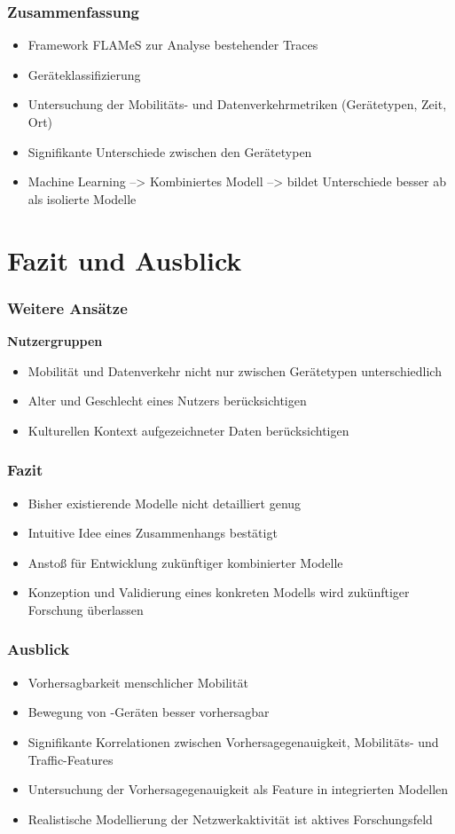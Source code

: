 \documentclass{beamer}
\begin{document}
\begin{frame}
  \frametitle{Zusammenfassung}
  \begin{itemize}
    \item Framework FLAMeS zur Analyse bestehender Traces
    \item Geräteklassifizierung
    \item Untersuchung der Mobilitäts- und Datenverkehrmetriken (Gerätetypen, Zeit, Ort)
    \item Signifikante Unterschiede zwischen den Gerätetypen
    \item Machine Learning --> Kombiniertes Modell --> bildet Unterschiede besser ab als isolierte Modelle
  \end{itemize}  
\end{frame}

\section{Fazit und Ausblick}

\begin{frame}
  \frametitle{Weitere Ansätze}
  \textbf{Nutzergruppen}
  \begin{itemize}
    \item Mobilität und Datenverkehr nicht nur zwischen Gerätetypen unterschiedlich
    \item Alter und Geschlecht eines Nutzers berücksichtigen
    \item Kulturellen Kontext aufgezeichneter Daten berücksichtigen    
  \end{itemize}
\end{frame}

\begin{frame}
  \frametitle{Fazit}
  \begin{itemize}
    \item Bisher existierende Modelle nicht detailliert genug
    \item Intuitive Idee eines Zusammenhangs bestätigt
    \item Anstoß für Entwicklung zukünftiger kombinierter Modelle
    \item Konzeption und Validierung eines konkreten Modells wird zukünftiger Forschung überlassen    
  \end{itemize}
\end{frame}

\begin{frame}
  \frametitle{Ausblick}
  \begin{itemize}
    \item Vorhersagbarkeit menschlicher Mobilität
    \item Bewegung von -Geräten besser vorhersagbar
    \item Signifikante Korrelationen zwischen Vorhersagegenauigkeit, Mobilitäts- und Traffic-Features
    \item Untersuchung der Vorhersagegenauigkeit als Feature in integrierten Modellen
    \item Realistische Modellierung der Netzwerkaktivität ist aktives Forschungsfeld
  \end{itemize}  
\end{frame}
\end{document}

